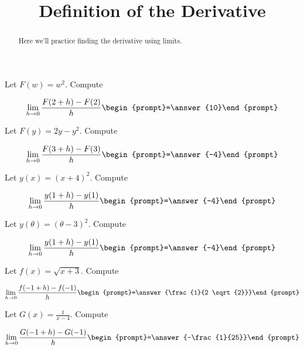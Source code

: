 \documentclass[handout]{ximera}
\title[Exercises:]{Definition of the Derivative}
\begin{document}
\begin{abstract}
  Here we'll practice finding the derivative using limits.
\end{abstract}
\maketitle

\begin{exercise}
Let $F(w) = w^2$. Compute

\[
\lim_{ h\to 0 } 
\frac{F(2+h)-F(2)}{h} \begin{prompt}=\answer{10}\end{prompt}
\]
\end{exercise}

\begin{exercise}
Let $F(y) = 2y-y^2$. Compute

\[
\lim_{ h\to 0 } 
\frac{F(3+h)-F(3)}{h} \begin{prompt}=\answer{-4}\end{prompt}
\]
\end{exercise}

\begin{exercise}
Let $y(x) = (x+4)^2$. Compute

\[
\lim_{ h\to 0 } \frac{y(1+h)-y(1)}{h} \begin{prompt}=\answer{-4}\end{prompt}
\]
\end{exercise}


\begin{exercise}
Let $y(\theta) = (\theta -3)^2$. Compute

\[
\lim_{ h\to 0 } \frac{y(1+h)-y(1)}{h} \begin{prompt}=\answer{-4}\end{prompt}
\]
\end{exercise}


\begin{exercise}
Let $f(x) = \sqrt{x+3}$. Compute

\[
\lim_{ h\to 0 } 
\frac{f(-1+h)-f(-1)}{h} \begin{prompt}=\answer{\frac{1}{2 \sqrt{2}}}\end{prompt}
\]
\end{exercise}


\begin{exercise}
Let $G(x) = \frac{1}{x-4}$. Compute

\[
\lim_{ h\to 0 } \frac{G(-1+h)-G(-1)}{h} \begin{prompt}=\answer{-\frac{1}{25}}\end{prompt}
\]
\end{exercise}
\end{document}
